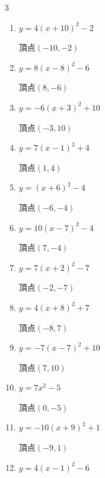 \begin{multicols}{3}
\begin{enumerate}
  \item $\displaystyle y=4\left( x+10\right)^{2}-2$

        $\displaystyle 頂点\left( -10 , -2 \right)$

  \item $\displaystyle y=8\left( x-8\right)^{2}-6$

        $\displaystyle 頂点\left( 8 , -6 \right)$

  \item $\displaystyle y=-6\left( x+3\right)^{2}+10$

        $\displaystyle 頂点\left( -3 , 10 \right)$

  \item $\displaystyle y=7\left( x-1\right)^{2}+4$

        $\displaystyle 頂点\left( 1 , 4 \right)$

  \item $\displaystyle y=\left( x+6\right)^{2}-4$

        $\displaystyle 頂点\left( -6 , -4 \right)$

  \item $\displaystyle y=10\left( x-7\right)^{2}-4$

        $\displaystyle 頂点\left( 7 , -4 \right)$

  \item $\displaystyle y=7\left( x+2\right)^{2}-7$

        $\displaystyle 頂点\left( -2 , -7 \right)$

  \item $\displaystyle y=4\left( x+8\right)^{2}+7$

        $\displaystyle 頂点\left( -8 , 7 \right)$

  \item $\displaystyle y=-7\left( x-7\right)^{2}+10$

        $\displaystyle 頂点\left( 7 , 10 \right)$

\columnbreak %

\resetques

  \item $\displaystyle y=7x^{2}-5$

        $\displaystyle 頂点\left( 0 , -5 \right)$

  \item $\displaystyle y=-10\left( x+9\right)^{2}+1$

        $\displaystyle 頂点\left( -9 , 1 \right)$

  \item $\displaystyle y=4\left( x-1\right)^{2}-6$


\end{enumerate}
\end{multicols}
